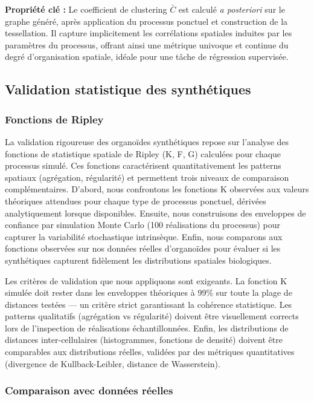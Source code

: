 \textbf{Propriété clé :} Le coefficient de clustering $\bar{C}$ est calculé \textit{a posteriori} sur le graphe généré, après application du processus ponctuel et construction de la tessellation. Il capture implicitement les corrélations spatiales induites par les paramètres du processus, offrant ainsi une métrique univoque et continue du degré d'organisation spatiale, idéale pour une tâche de régression supervisée.

\subsection{Validation statistique des synthétiques}

\subsubsection{Fonctions de Ripley}

La validation rigoureuse des organoïdes synthétiques repose sur l'analyse des fonctions de statistique spatiale de Ripley (K, F, G) calculées pour chaque processus simulé. Ces fonctions caractérisent quantitativement les patterns spatiaux (agrégation, régularité) et permettent trois niveaux de comparaison complémentaires. D'abord, nous confrontons les fonctions K observées aux valeurs théoriques attendues pour chaque type de processus ponctuel, dérivées analytiquement lorsque disponibles. Ensuite, nous construisons des enveloppes de confiance par simulation Monte Carlo (100 réalisations du processus) pour capturer la variabilité stochastique intrinsèque. Enfin, nous comparons aux fonctions observées sur nos données réelles d'organoïdes pour évaluer si les synthétiques capturent fidèlement les distributions spatiales biologiques.

Les critères de validation que nous appliquons sont exigeants. La fonction K simulée doit rester dans les enveloppes théoriques à 99\% sur toute la plage de distances testées — un critère strict garantissant la cohérence statistique. Les patterns qualitatifs (agrégation vs régularité) doivent être visuellement corrects lors de l'inspection de réalisations échantillonnées. Enfin, les distributions de distances inter-cellulaires (histogrammes, fonctions de densité) doivent être comparables aux distributions réelles, validées par des métriques quantitatives (divergence de Kullback-Leibler, distance de Wasserstein).

\subsubsection{Comparaison avec données réelles}

